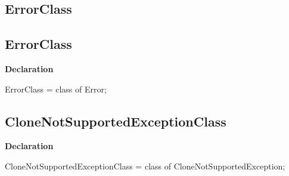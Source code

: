 \documentclass{report}
\newif\ifpdf
\begin{document}
\subsection*{\large{\textbf{ErrorClass}}\normalsize\hspace{1ex}\hrulefill}
\else
\subsection*{ErrorClass}
\fi
\label{NewPascal.Base-ErrorClass}
\begin{list}{}{
\setlength{\itemindent}{0cm}
\setlength{\listparindent}{0cm}
\setlength{\leftmargin}{\evensidemargin}
\addtolength{\leftmargin}{\tmplength}
\settowidth{\labelsep}{X}
\addtolength{\leftmargin}{\labelsep}
\setlength{\labelwidth}{\tmplength}
}
\item[\textbf{Declaration}\hfill]
\ifpdf
\begin{flushleft}
\fi
\begin{ttfamily}
ErrorClass = class of Error;\end{ttfamily}

\ifpdf
\end{flushleft}
\fi

\end{list}
\ifpdf
\subsection*{\large{\textbf{CloneNotSupportedExceptionClass}}\normalsize\hspace{1ex}\hrulefill}
\else
\subsection*{CloneNotSupportedExceptionClass}
\fi
\label{NewPascal.Base-CloneNotSupportedExceptionClass}
\begin{list}{}{
\setlength{\itemindent}{0cm}
\setlength{\listparindent}{0cm}
\setlength{\leftmargin}{\evensidemargin}
\addtolength{\leftmargin}{\tmplength}
\settowidth{\labelsep}{X}
\addtolength{\leftmargin}{\labelsep}
\setlength{\labelwidth}{\tmplength}
}
\item[\textbf{Declaration}\hfill]
\ifpdf
\begin{flushleft}
\fi
\begin{ttfamily}
CloneNotSupportedExceptionClass = class of CloneNotSupportedException;\end{ttfamily}

\ifpdf
\end{flushleft}
\fi

\end{list}
\ifpdf
\end{document}
